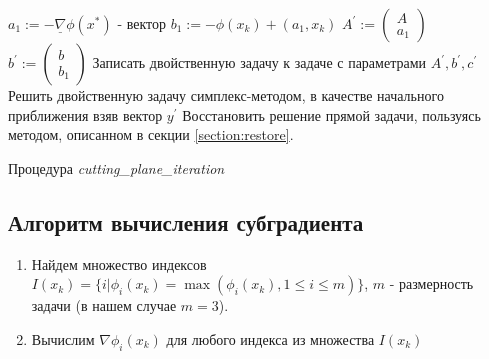 \documentclass[main.tex]{subfiles}
\begin{document}
\begin{algorithm}[H]
	 
	$a_1 := - \underline{\nabla} \phi(x^*)$ - вектор\;
	$b_1 :=  - \phi(x_k)+ (a_1, x_k)$ \;
	$A^{'} := \begin{pmatrix}A\\a_1\end{pmatrix}$ \;
	$b^{'} := \begin{pmatrix}b\\b_1\end{pmatrix}$\;
	Записать двойственную задачу к задаче с параметрами $A^{'}, b^{'}, c^{'}$\;
	Решить двойственную задачу симплекс-методом, в качестве начального приближения взяв вектор $y^{'}$\;
	Восстановить решение прямой задачи, пользуясь методом, описанном в секции \ref{section:restore}.
	
	\caption{Процедура \emph{cutting\_plane\_iteration}}
\end{algorithm}

\subsection{Алгоритм вычисления субградиента}
\begin{enumerate}
	\item Найдем множество индексов $I(x_k) = \{i | \phi_i(x_k)=\max(\phi_i(x_k), 1 \leq i \leq m)\} $, $m$ - размерность задачи (в нашем случае $m = 3$).
	\item Вычислим  $\nabla\phi_i(x_k)$ для любого индекса из множества $I(x_k)$ 
\end{enumerate}

 
\end{document}
